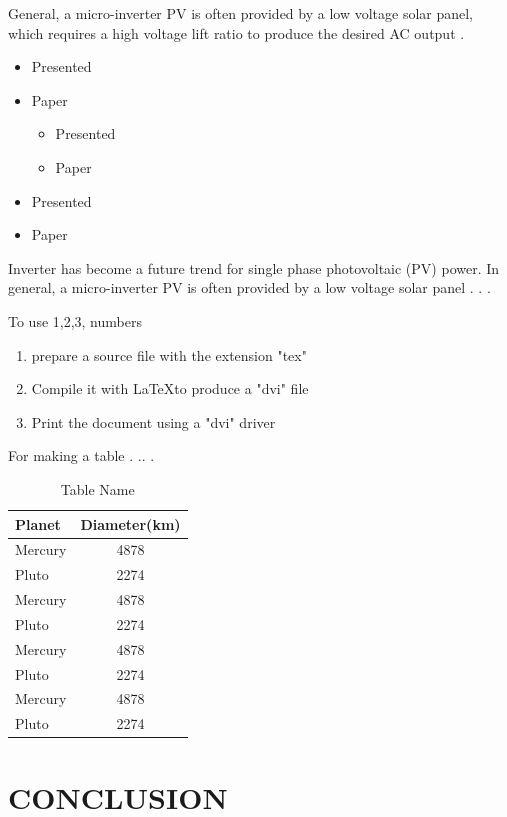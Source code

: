 General, a micro-inverter PV  is often provided by a low voltage solar panel, which requires a high voltage lift ratio to produce the desired AC output .


\begin{itemize}
\item{Presented}
\item{Paper  }
	\begin{itemize}
		\item{Presented}
		\item{Paper  }
	\end{itemize}
\item{Presented}
\item{Paper  }
\end{itemize}


Inverter has become a future trend for single phase photovoltaic (PV) power. In general, a micro-inverter PV  is often provided by a low voltage solar panel . . . \vspace{2 cm} %

To use 1,2,3, numbers

\begin{enumerate}
\item prepare a source file with the extension "tex"
\item Compile it with \LaTeX to produce a "dvi" file
\item Print the document using a "dvi" driver
\end{enumerate}


For making a table . .. .

\begin{table}[h]
\centering
\begin{tabular}{|l|c|}
\hline
Planet & Diameter(km) \\
\hline
Mercury & 4878\\
Pluto & 2274\\
Mercury & 4878\\
Pluto & 2274\\
Mercury & 4878\\
Pluto & 2274\\
Mercury & 4878\\
Pluto & 2274\\
\hline
\end{tabular}
\caption{Table Name}
\end{table}




\chapter{CONCLUSION}


